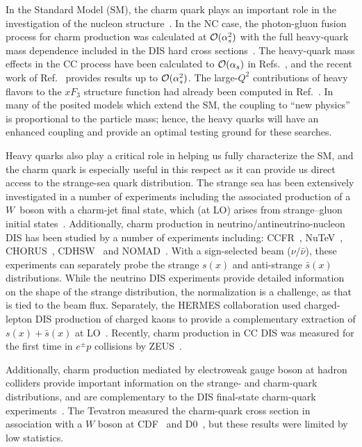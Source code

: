\documentclass[pdftex,twocolumn,epjc3]{svjour3}          %
\begin{document}
In the Standard Model (SM), the charm quark plays an important role in
the investigation of the nucleon
structure~\cite{Behnke:2015qja,Zenaiev:2016kfl,Abdolmaleki:2017wlg,Abdolmaleki:2019tbb}.
%
In the NC case, the photon-gluon fusion process for charm production
was calculated at ${\cal O}(\alpha_s^2)$ with the full
heavy-quark mass dependence included in the DIS hard cross
sections~\cite{Laenen:1992zk,Laenen:1992xs}.
%
The heavy-quark mass effects in the CC process have been calculated to
${\cal O}(\alpha_s)$ in
Refs.~\cite{Gottschalk:1980rv,Gluck:1997sj,Blumlein:2011zu,Buza:1997mg,Blumlein:2014fqa},
and the recent work of Ref.~\cite{Berger:2016inr} provides results up
to ${\cal O}(\alpha_s^2)$. The large-$Q^2$ contributions of heavy flavors to the
$xF_3$ structure function had already been computed in
Ref.~\cite{Behring:2015roa}.
%
In many of the posited models which extend the SM, the coupling to
``new physics'' is proportional to the particle mass; hence, the heavy
quarks will have an enhanced coupling and provide an optimal testing
ground for these searches.

Heavy quarks also play a critical role in helping us fully
characterize the SM, and the charm quark is especially useful in this
respect as it can provide us direct access to the strange-sea quark
distribution.
%
The strange sea has been extensively investigated in a number of
experiments including  the associated production of a $W$~boson
with a charm-jet final state, which (at LO)
arises from strange--gluon initial states~\cite{Aaltonen:2007dm,Abazov:2008qz,Abazov:2014fka,Chatrchyan:2013uja,Aad:2014xca,Sirunyan:2018hde}.
%
Additionally, charm production in neutrino/antineutrino-nucleon DIS
has been studied by a number of experiments including:
%
CCFR~\cite{Seligman:1997mc},
NuTeV~\cite{Tzanov:2005kr},
CHORUS~\cite{Onengut:2005kv},
CDHSW~\cite{Berge:1989hr}
and
NOMAD~\cite{Samoylov:2013xoa}.
%
With a sign-selected beam ($\nu/\bar{\nu}$), these experiments can
separately probe the strange $s(x)$ and anti-strange $\bar{s}(x)$
distributions. While the neutrino DIS experiments provide
detailed information on the shape of the strange distribution, the
normalization is a challenge, as that is tied to the beam flux.
%
Separately, the HERMES collaboration used charged-lepton DIS
production of charged kaons to provide a complementary extraction of
$s(x)+ \bar{s}(x)$ at LO~\cite{Airapetian:2008qf}.
%
Recently, charm production in CC DIS was measured for the first time in $e^{\pm}p$ collisions by ZEUS~\cite{Abt:2019ngj}.

Additionally, charm production mediated by electroweak gauge boson at
hadron colliders provide important information on the strange- and
charm-quark distributions, and are complementary to the DIS final-state
charm-quark experiments~\cite{Lai:2007dq}.
%
The Tevatron measured the charm-quark cross section in association
with a $W$ boson at CDF~\cite{Aaltonen:2007dm} and
D0~\cite{Abazov:2008qz}, but these results were limited by low
statistics.
\end{document}
